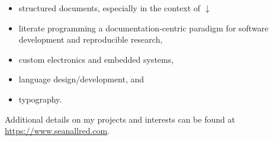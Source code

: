 \documentclass{simplecv}
\begin{document}
\noindent
\begin{minipage}[t]{0.55\linewidth}
  \begin{itemize}\RaggedRight
  \item structured documents, especially in the context of $\downarrow$
  \item literate programming \Dash a documentation-centric paradigm
    for software development and reproducible research,
  \end{itemize}
\end{minipage}
\hfill
\begin{minipage}[t]{0.4\linewidth}
  \begin{itemize}
  \item custom electronics and embedded systems,
  \item language design/development, and
  \item typography.
  \end{itemize}
\end{minipage}
\vfill
\medskip
\centering
Additional details on my projects and interests can be found at
  \url{https://www.seanallred.com}.
\vfill
\end{document}
